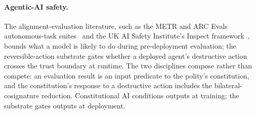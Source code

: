 \paragraph{Agentic-AI safety.}
The alignment-evaluation literature, such as the METR and ARC Evals
autonomous-task suites~\cite{kinniment2023autonomous} and the UK AI
Safety Institute's Inspect framework~\cite{aisiInspect2024}, bounds what a model is likely
to do during pre-deployment evaluation; the reversible-action substrate
gates whether a deployed agent's destructive action crosses the trust
boundary at runtime. The two disciplines compose rather than compete:
an evaluation result is an input predicate to the polity's
constitution, and the constitution's response to a destructive action
includes the bilateral-cosignature reduction. Constitutional AI
conditions outputs at training; the substrate gates outputs at
deployment.
